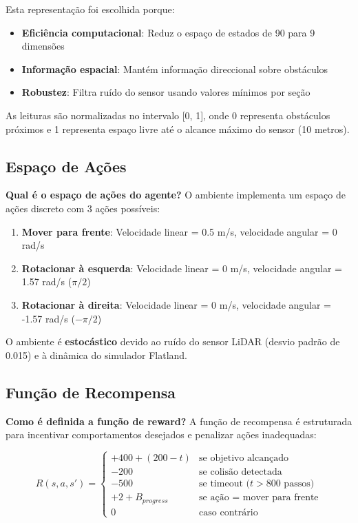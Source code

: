 \documentclass[9pt,a4paper,twoside]{tau}
\begin{document}
Esta representação foi escolhida porque:
\begin{itemize}
    \item \textbf{Eficiência computacional}: Reduz o espaço de estados de 90 para 9 dimensões
    \item \textbf{Informação espacial}: Mantém informação direccional sobre obstáculos
    \item \textbf{Robustez}: Filtra ruído do sensor usando valores mínimos por seção
\end{itemize}

As leituras são normalizadas no intervalo [0, 1], onde 0 representa obstáculos próximos e 1 representa espaço livre até o alcance máximo do sensor (10 metros).

\subsection{Espaço de Ações}

\textbf{Qual é o espaço de ações do agente?} O ambiente implementa um espaço de ações discreto com 3 ações possíveis:

\begin{enumerate}
    \item \textbf{Mover para frente}: Velocidade linear = 0.5 m/s, velocidade angular = 0 rad/s
    \item \textbf{Rotacionar à esquerda}: Velocidade linear = 0 m/s, velocidade angular = 1.57 rad/s ($\pi/2$)
    \item \textbf{Rotacionar à direita}: Velocidade linear = 0 m/s, velocidade angular = -1.57 rad/s ($-\pi/2$)
\end{enumerate}

O ambiente é \textbf{estocástico} devido ao ruído do sensor LiDAR (desvio padrão de 0.015) e à dinâmica do simulador Flatland.

\subsection{Função de Recompensa}

\textbf{Como é definida a função de reward?} A função de recompensa é estruturada para incentivar comportamentos desejados e penalizar ações inadequadas:

\begin{equation} \label{ec:reward}
R(s,a,s') = \begin{cases}
+400 + (200 - t) & \text{se objetivo alcançado} \\
-200 & \text{se colisão detectada} \\
-500 & \text{se timeout (} t > 800 \text{ passos)} \\
+2 + B_{progress} & \text{se ação = mover para frente} \\
0 & \text{caso contrário}
\end{cases}
\end{equation}
\end{document}
